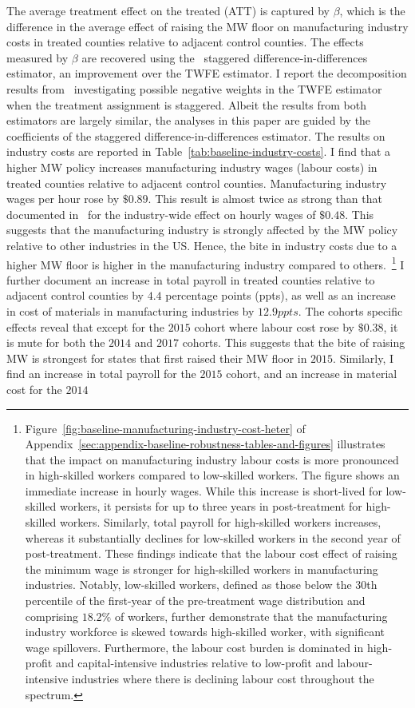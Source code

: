 \documentclass{C:/Users/david/OneDrive/Documents/ULMS/PhD/Thesis/chapter3/src/climate_change/latex/Economic_Journal/OUP-EJ}
\begin{document}
    The average treatment effect on the treated (ATT) is captured by $\beta$, which is the difference in the average effect of raising the MW floor on manufacturing industry costs in treated counties relative to adjacent control counties. The effects measured by $\beta$ are recovered using the~\citet{sun2021estimating} staggered difference-in-differences estimator, an improvement over the TWFE estimator. I report the decomposition results from~\citet{de2020two} investigating possible negative weights in the TWFE estimator when the treatment assignment is staggered. Albeit the results from both estimators are largely similar, the analyses in this paper are guided by the coefficients of the staggered difference-in-differences estimator. The results on industry costs are reported in Table~\ref{tab:baseline-industry-costs}. I find that a higher MW policy increases manufacturing industry wages (labour costs) in treated counties relative to adjacent control counties. Manufacturing industry wages per hour rose by $\$0.89$. This result is almost twice as strong than that documented in~\citet{gopalan2021state} for the industry-wide effect on hourly wages of $\$0.48$. This suggests that the manufacturing industry is strongly affected by the MW policy relative to other industries in the US. Hence, the bite in industry costs due to a higher MW floor is higher in the manufacturing industry compared to others.~\footnote{\tiny Figure~\ref{fig:baseline-manufacturing-industry-cost-heter} of Appendix~\ref{sec:appendix-baseline-robustness-tables-and-figures} illustrates that the impact on manufacturing industry labour costs is more pronounced in high-skilled workers compared to low-skilled workers. The figure shows an immediate increase in hourly wages. While this increase is short-lived for low-skilled workers, it persists for up to three years in post-treatment for high-skilled workers. Similarly, total payroll for high-skilled workers increases, whereas it substantially declines for low-skilled workers in the second year of post-treatment. These findings indicate that the labour cost effect of raising the minimum wage is stronger for high-skilled workers in manufacturing industries. Notably, low-skilled workers, defined as those below the 30th percentile of the first-year of the pre-treatment wage distribution and comprising $18.2\%$ of workers, further demonstrate that the manufacturing industry workforce is skewed towards high-skilled worker, with significant wage spillovers. Furthermore, the labour cost burden is dominated in high-profit and capital-intensive industries relative to low-profit and labour-intensive industries where there is declining labour cost throughout the spectrum.} I further document an increase in total payroll in treated counties relative to adjacent control counties by $4.4$ percentage points (ppts), as well as an increase in cost of materials in manufacturing industries by $12.9ppts$. The cohorts specific effects reveal that except for the $2015$ cohort where labour cost rose by $\$0.38$, it is mute for both the $2014$ and $2017$ cohorts. This suggests that the bite of raising MW is strongest for states that first raised their MW floor in $2015$. Similarly, I find an increase in total payroll for the $2015$ cohort, and an increase in material cost for the $2014$ 
\end{document}
